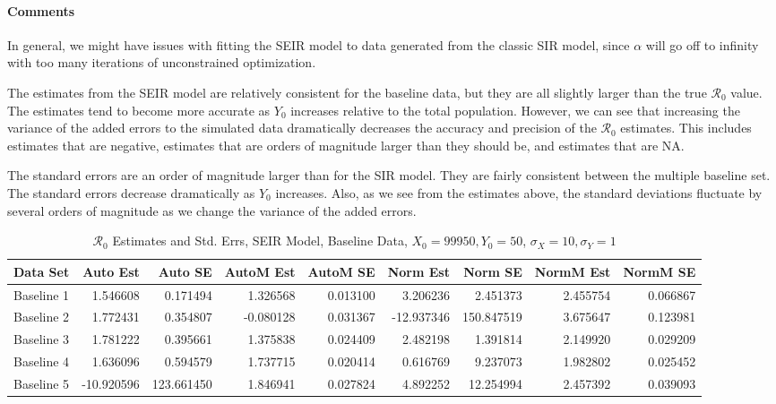 \documentclass[12pt]{article}
\newcommand{\rr}{\ensuremath{\mathcal{R}_0}}
\begin{document}
\paragraph{Comments}

In general, we might have issues with fitting the SEIR model to data generated from the classic SIR model, since $\alpha$ will go off to infinity with too many iterations of unconstrained optimization. 

The estimates from the SEIR model are relatively consistent for the baseline data, but they are all slightly larger than the true $\rr$ value. The estimates tend to become more accurate as $Y_0$ increases relative to the total population. However, we can see that increasing the variance of the added errors to the simulated data dramatically decreases the accuracy and precision of the $\rr$ estimates. This includes estimates that are negative, estimates that are orders of magnitude larger than they should be, and estimates that are NA.

The standard errors are an order of magnitude larger than for the SIR model. They are fairly consistent between the multiple baseline set. The standard errors decrease dramatically as $Y_0$ increases. Also, as we see from the estimates above, the standard deviations fluctuate by several orders of magnitude as we change the variance of the added errors. 

\begin{table}[H]
	
	\caption{$\rr$ Estimates and Std. Errs, SEIR Model, 
		Baseline Data, $X_0 = 99950, Y_0 = 50$, 
		$\sigma_X = 10, \sigma_Y = 1$}
	\begin{footnotesize}
		\hskip -1cm
		\begin{tabular}{l|r|r|r|r|r|r|r|r}
			\hline
			Data Set & Auto Est & Auto SE & AutoM Est & AutoM SE & Norm Est & Norm SE & NormM Est & NormM SE\\
			\hline
			Baseline 1 & 1.546608 & 0.171494 & 1.326568 & 0.013100 & 3.206236 & 2.451373 & 2.455754 & 0.066867\\
			\hline
			Baseline 2 & 1.772431 & 0.354807 & -0.080128 & 0.031367 & -12.937346 & 150.847519 & 3.675647 & 0.123981\\
			\hline
			Baseline 3 & 1.781222 & 0.395661 & 1.375838 & 0.024409 & 2.482198 & 1.391814 & 2.149920 & 0.029209\\
			\hline
			Baseline 4 & 1.636096 & 0.594579 & 1.737715 & 0.020414 & 0.616769 & 9.237073 & 1.982802 & 0.025452\\
			\hline
			Baseline 5 & -10.920596 & 123.661450 & 1.846941 & 0.027824 & 4.892252 & 12.254994 & 2.457392 & 0.039093\\
			\hline
		\end{tabular}
	\end{footnotesize}
\end{table}
\end{document}
